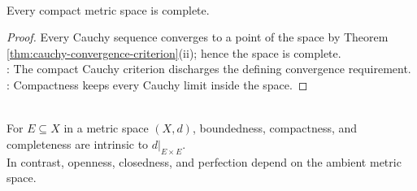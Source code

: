 \begin{corollary} \label{cor:compact-metric-spaces-complete} \\
Every compact metric space is complete.
\begin{proof}
Every Cauchy sequence converges to a point of the space by Theorem \ref{thm:cauchy-convergence-criterion}(ii); hence the space is complete.\\
: The compact Cauchy criterion discharges the defining convergence requirement.\\
: Compactness keeps every Cauchy limit inside the space.
\end{proof}
\end{corollary}

\begin{remark} \label{rem:boundedness-and-intrinsic-metric-properties} \\
For $E\subseteq X$ in a metric space $(X,d)$, boundedness, compactness, and completeness are intrinsic to $d|_{E\times E}$.\\
In contrast, openness, closedness, and perfection depend on the ambient metric space.
\end{remark}

